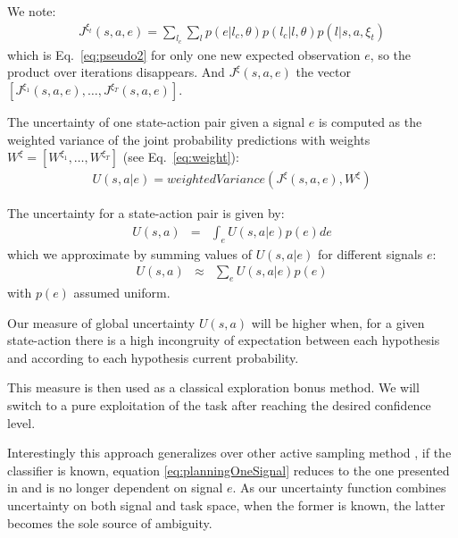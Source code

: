 We note:
\begin{eqnarray}
J^{\xi_t}(s,a,e) = \sum_{l_c}\sum_l  p(e | l_c, \theta)  p(l_c | l, \theta) p(l|s,a,\xi_t) \nonumber
\end{eqnarray}
which is Eq.~\ref{eq:pseudo2} for only one new expected observation $e$, so the product over iterations disappears. And $J^{\xi}(s,a,e)$ the vector $[J^{\xi_1}(s,a,e), \ldots, J^{\xi_T}(s,a,e)]$.

The uncertainty of one state-action pair given a signal $e$ is computed as the weighted variance of the joint probability predictions with weights $W^{\xi} = [W^{\xi_1}, \ldots, W^{\xi_T}]$ (see Eq.~\ref{eq:weight}):
\begin{eqnarray}
U(s,a|e) = weightedVariance(J^{\xi}(s,a,e), W^{\xi})
\label{eq:planningOneSignal}
\end{eqnarray}

The uncertainty for a state-action pair is given by:
\begin{eqnarray}
U(s,a) & = & \int_{e} U(s,a|e) p(e) de
\end{eqnarray}
which we approximate by summing values of $U(s,a|e)$ for different signals $e$:
\begin{eqnarray}
U(s,a) & \approx & \sum_{e} U(s,a|e) p(e)
\label{eq:planning}
\end{eqnarray}
with $p(e)$ assumed uniform.
%


Our measure of global uncertainty $U(s,a)$ will be higher when, for a given state-action there is a high incongruity of expectation between each hypothesis and according to each hypothesis current probability. 

This measure is then used as a classical exploration bonus method. We will switch to a pure exploitation of the task after reaching the desired confidence level.

Interestingly this approach generalizes over other active sampling method \cite{lopes2009active}, if the classifier is known, equation \ref{eq:planningOneSignal} reduces to the one presented in \cite{macl11simul} and is no longer dependent on signal $e$. As our uncertainty function combines uncertainty on both signal and task space, when the former is known, the latter becomes the sole source of ambiguity.



